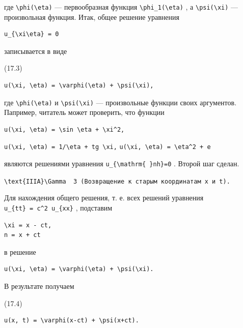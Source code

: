 \documentclass[
  ukrainian,
]{article}
\begin{document}
где \texttt{\textbackslash{}phi(\textbackslash{}eta)} --- первообразная
функция \texttt{\textbackslash{}phi\_1(\textbackslash{}eta)} , а
\texttt{\textbackslash{}psi(\textbackslash{}xi)} --- произвольная
функция. Итак, общее решение уравнения

\begin{verbatim}
u_{\xi\eta} = 0
\end{verbatim}

записывается в виде

(17.3)

\begin{verbatim}
u(\xi, \eta) = \varphi(\eta) + \psi(\xi),
\end{verbatim}

где \texttt{\textbackslash{}phi(\textbackslash{}eta)} и
\texttt{\textbackslash{}psi(\textbackslash{}xi)} --- произвольные
функции своих аргументов. Папример, читатель может проверить, что
функции

\begin{verbatim}
u(\xi, \eta) = \sin \eta + \xi^2,
\end{verbatim}

\texttt{u(\textbackslash{}xi,\ \textbackslash{}eta)\ =\ 1/\textbackslash{}eta\ +\ tg\ \textbackslash{}xi,}
\texttt{u(\textbackslash{}xi,\ \textbackslash{}eta)\ =\ \textbackslash{}eta\^{}2\ +\ e}

являются решениями уравнения
\texttt{u\_\{\textbackslash{}mathrm\{\ \}nh\}=0} . Второй шаг сделан.

\texttt{\textquotesingle{}\textbackslash{}text\{IIIA\}\textbackslash{}Gamma\textquotesingle{}\ \ 3\ (Возвращение\ к\ старым\ координатам\ x\ и\ t).}

Для нахождения общего решения, т. е. всех решений уравнения
\texttt{u\_\{tt\}\ =\ c\^{}2\ u\_\{xx\}} , подставим

\begin{verbatim}
\xi = x - ct,
n = x + ct
\end{verbatim}

в решение

\begin{verbatim}
u(\xi, \eta) = \varphi(\eta) + \psi(\xi).
\end{verbatim}

В результате получаем

(17.4)

\begin{verbatim}
u(x, t) = \varphi(x-ct) + \psi(x+ct).
\end{verbatim}
\end{document}
